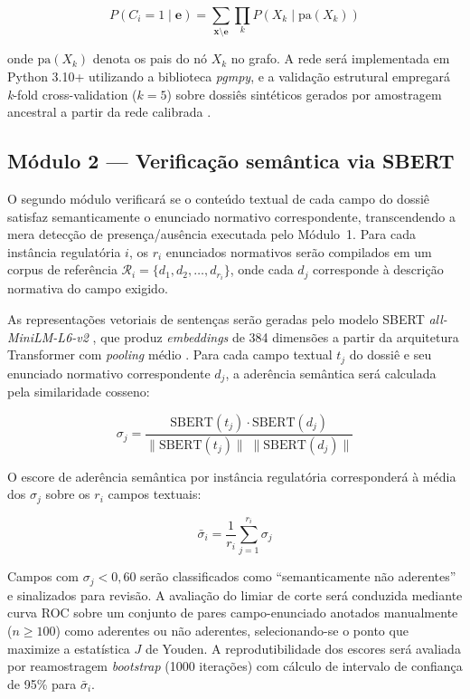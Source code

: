 \documentclass[preprint,12pt,authoryear]{elsarticle}
\begin{document}
\begin{equation}
P(C_i = 1 \mid \mathbf{e}) = \sum_{\mathbf{x} \setminus \mathbf{e}} \prod_{k} P(X_k \mid \text{pa}(X_k))
\label{eq:bayesconf}
\end{equation}

\noindent onde $\text{pa}(X_k)$ denota os pais do nó $X_k$ no grafo. A rede será implementada em Python 3.10+ utilizando a biblioteca \textit{pgmpy}, e a validação estrutural empregará \textit{k}-fold cross-validation ($k = 5$) sobre dossiês sintéticos gerados por amostragem ancestral a partir da rede calibrada \citep{Pearl2009}.

\subsection{Módulo 2 --- Verificação semântica via SBERT}
\label{subsec:sbert}

O segundo módulo verificará se o conteúdo textual de cada campo do dossiê satisfaz semanticamente o enunciado normativo correspondente, transcendendo a mera detecção de presença/ausência executada pelo Módulo~1. Para cada instância regulatória $i$, os $r_i$ enunciados normativos serão compilados em um corpus de referência $\mathcal{R}_i = \{d_1, d_2, \ldots, d_{r_i}\}$, onde cada $d_j$ corresponde à descrição normativa do campo exigido.

As representações vetoriais de sentenças serão geradas pelo modelo SBERT \textit{all-MiniLM-L6-v2} \citep{Reimers2019}, que produz \textit{embeddings} de 384 dimensões a partir da arquitetura Transformer com \textit{pooling} médio \citep{Devlin2019}. Para cada campo textual $t_j$ do dossiê e seu enunciado normativo correspondente $d_j$, a aderência semântica será calculada pela similaridade cosseno:

\begin{equation}
\sigma_j = \frac{\text{SBERT}(t_j) \cdot \text{SBERT}(d_j)}{\|\text{SBERT}(t_j)\| \; \|\text{SBERT}(d_j)\|}
\label{eq:cosseno}
\end{equation}

O escore de aderência semântica por instância regulatória corresponderá à média dos $\sigma_j$ sobre os $r_i$ campos textuais:

\begin{equation}
\bar{\sigma}_i = \frac{1}{r_i} \sum_{j=1}^{r_i} \sigma_j
\label{eq:sigma_mean}
\end{equation}

Campos com $\sigma_j < 0{,}60$ serão classificados como ``semanticamente não aderentes'' e sinalizados para revisão. A avaliação do limiar de corte será conduzida mediante curva ROC sobre um conjunto de pares campo-enunciado anotados manualmente ($n \geq 100$) como aderentes ou não aderentes, selecionando-se o ponto que maximize a estatística $J$ de Youden. A reprodutibilidade dos escores será avaliada por reamostragem \textit{bootstrap} (1000 iterações) com cálculo de intervalo de confiança de 95\% para $\bar{\sigma}_i$.
\end{document}
